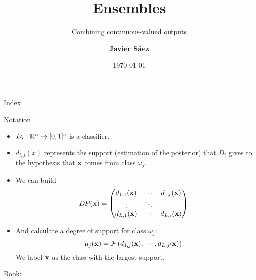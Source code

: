 \documentclass[xcolor=table]{beamer}
\begin{document}
\title{Ensembles}
\subtitle{Combining continuous-valued outputs}
\author[Javier Sáez]{\textbf {Javier Sáez}} %
\date{\today}



{
\begin{frame}[noframenumbering]
\titlepage
\end{frame}


\begin{frame}[noframenumbering]{Index}
\tableofcontents
\end{frame}}


    
\begin{frame}{Notation}
\begin{itemize}
    \item \(D_i: {\mathbb R}^n \to [0,1]^c\) is a classifier.
    \item \(d_{i,j}(x)\) represents the support (estimation of the posterior) that \(D_i\) gives to the hypothesis that \({\mathbf x}\) comes from class \(\omega_j\).
    \item We can build
    \[
    DP({\mathbf x}) = \begin{pmatrix}
        d_{1,1}({\mathbf x}) & \cdots & d_{1,c}({\mathbf x})\\
        \vdots & \ddots & \vdots \\
        d_{L,1}({\mathbf x}) & \cdots & d_{L,c}({\mathbf x})
    \end{pmatrix}.
    \]
    \item And calculate a degree of support for class \(\omega_j\):
    \[
    \mathbf{\mu}_j({\mathbf x}) = \mathbf{\mathcal F}\left(d_{1,j}({\mathbf x}),\cdots, d_{L,j}({\mathbf x})\right).
    \]
    We label \({\mathbf x}\) as the class with the largest support.
\end{itemize}

\vspace{1cm}
Book: 
    \cite{10.5555/2935490}
\end{frame}



\end{document}
